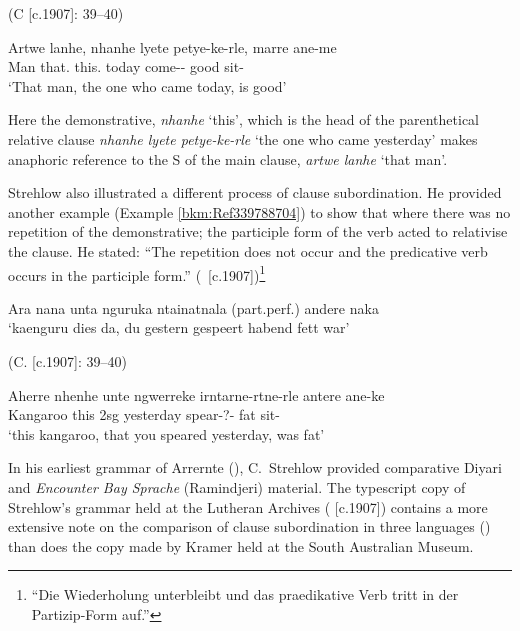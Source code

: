  (C \citealt{strehlow_untitled_1931} [c.1907]: 39--40)

\gll Artwe      lanhe,                nhanhe          lyete      petye-ke-rle,             marre    ane-me\\
Man        that.          this.      today    come--      good      sit-\\
\glt `That man, the one who came today, is good'
\z

Here the demonstrative, \textit{nhanhe} `this', which is the head of the parenthetical relative clause \textit{nhanhe lyete petye-ke-rle} `the one who came yesterday' makes anaphoric reference to the S of the main clause, \textit{artwe lanhe} `that man'.

Strehlow also illustrated a different process of clause subordination. He provided another example (Example \ref{bkm:Ref339788704}) to show that where there was no repetition of the demonstrative; the participle form of the verb acted to relativise the clause. He stated: “The repetition does not occur and the predicative verb occurs in the participle form.'' (\citealt[39--40]{strehlow_untitled_1931}~[c.1907])\footnote{“Die Wiederholung unterbleibt und das praedikative Verb tritt in der Partizip-Form auf.”}

\ea
     \label{bkm:Ref339788704}Ara     nana         unta              nguruka         ntainatnala (part.perf.)   andere    naka\\
\glt `kaenguru dies da, du gestern gespeert habend  fett war'

(C. \citealt{strehlow_untitled_1931} [c.1907]: 39--40)

\gll Aherre     nhenhe      unte              ngwerreke     irntarne-rtne-rle              antere      ane-ke\\
Kangaroo   this         2sg      yesterday       spear-?-      fat             sit-\\
\glt `this kangaroo, that you speared yesterday, was fat'
\z

In his earliest grammar of Arrernte (), C.~Strehlow provided comparative Diyari and \textit{Encounter Bay Sprache} (Ramindjeri) material. The typescript copy of Strehlow’s grammar held at the Lutheran Archives (\citeyear{strehlow_grammatik_1931} [c.1907]) contains a more extensive note on the comparison of clause subordination in three languages () than does the copy made by Kramer held at the South Australian Museum.

